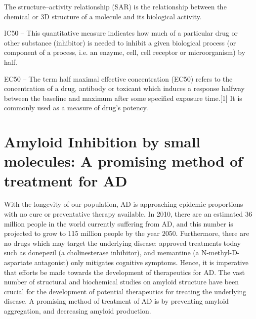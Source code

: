 The structure–activity relationship (SAR) is the relationship between the chemical or 3D structure of a molecule and its biological activity. 

IC50 -- This quantitative measure indicates how much of a particular drug or other substance (inhibitor) is needed to inhibit a given biological process (or component of a process, i.e. an enzyme, cell, cell receptor or microorganism) by half.

EC50 -- The term half maximal effective concentration (EC50) refers to the concentration of a drug, antibody or toxicant which induces a response halfway between the baseline and maximum after some specified exposure time.[1] It is commonly used as a measure of drug's potency.

\section{Amyloid Inhibition by small molecules: A promising method of treatment for AD}
      



With the longevity of our population, AD is approaching epidemic proportions with no cure or preventative therapy available.\cite{Blennow:2006wd} In 2010, there are an estimated 36 million people in the world currently suffering from AD, and this number is projected to grow to 115 million people by the year 2050.\cite{alzreport:2012}  Furthermore, there are no drugs which may target the underlying disease: approved treatments today such as donepezil (a cholinesterase inhibitor), and memantine (a N-methyl-D-aspartate antagonist) only mitigates cognitive symptoms. Hence, it is imperative that efforts be made towards the development of therapeutics for AD.  The vast number of structural and biochemical studies on amyloid structure have been crucial for the development of potential therapeutics for treating the underlying disease.  A promising method of treatment of AD is by preventing amyloid aggregation, and decreasing amyloid production.

